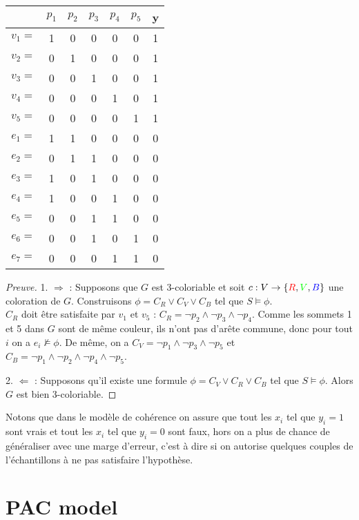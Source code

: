 \documentclass{article}
\theoremstyle{plain}
\theoremstyle{remark}
\theoremstyle{definition}
\begin{document}
\begin{center}
\begin{tabular}{ | c | c | c | c | c | c || c |  } 
    \hline
    & $p_1$ & $p_2$ & $p_3$ & $p_4$ & $p_5$ & y \\
    \hline
    $v_1=$ & 1 & 0 & 0 & 0 & 0 & 1\\
    \hline
    $v_2=$ & 0 & 1 & 0 & 0 & 0 & 1\\
    \hline
    $v_3=$ & 0 & 0 & 1 & 0 & 0 & 1\\
    \hline
    $v_4=$ & 0 & 0 & 0 & 1 & 0 & 1\\
    \hline
    $v_5=$ & 0 & 0 & 0 & 0 & 1 & 1\\
    \hline
    \hline
    $e_1=$ & 1 & 1 & 0 & 0 & 0 & 0\\
    \hline
    $e_2=$ & 0 & 1 & 1 & 0 & 0 & 0\\
    \hline
    $e_3=$ & 1 & 0 & 1 & 0 & 0 & 0\\
    \hline
    $e_4=$ & 1 & 0 & 0 & 1 & 0 & 0\\
    \hline
    $e_5=$ & 0 & 0 & 1 & 1 & 0 & 0\\
    \hline
    $e_6=$ & 0 & 0 & 1 & 0 & 1 & 0\\
    \hline
    $e_7=$ & 0 & 0 & 0 & 1 & 1 & 0\\
    \hline
\end{tabular}
\end{center}

\begin{proof}[Preuve]
1. $\Rightarrow$ : Supposons que $G$ est 3-coloriable et soit $c : V\rightarrow \{\textcolor{red}{R},\textcolor{green}{V},\textcolor{blue}{B}\}$ une coloration de $G$. Construisons $\phi=C_R\lor C_V\lor C_B$ tel que $S\models\phi$.\\
$C_R$ doit être satisfaite par $v_1$ et $v_5$ : $C_R=\neg p_2\land \neg p_3\land\neg p_4$. Comme les sommets 1 et 5 dans $G$ sont de même couleur, ils n'ont pas d'arête commune, donc pour tout $i$ on a $e_i \not\models \phi$. De même, on a $C_V=\neg p_1\land \neg p_3\land \neg p_5$ et $C_B=\neg p_1\land \neg p_2 \land \neg p_4 \land \neg p_5$.

2. $\Leftarrow$ : Supposons qu'il existe une formule $\phi=C_V\lor C_R\lor C_B$ tel que $S\models \phi$. Alors $G$ est bien 3-coloriable.
\end{proof}

Notons que dans le modèle de cohérence on assure que tout les $x_i$ tel que $y_i=1$ sont vrais et tout les $x_i$ tel que $y_i=0$ sont faux, hors on a plus de chance de généraliser avec une marge d'erreur, c'est à dire si on autorise quelques couples de l'échantillons à ne pas satisfaire l'hypothèse.

\section{PAC model}
\end{document}
